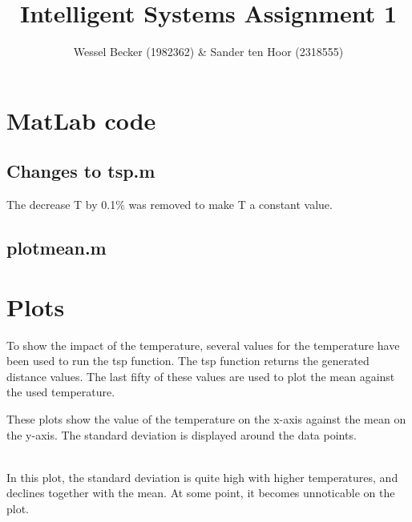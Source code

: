 \documentclass[10pt,a4paper]{article}
\begin{document}
\title{Intelligent Systems Assignment 1}
\author{Wessel Becker (1982362) \& Sander ten Hoor (2318555)}
\maketitle
\section{MatLab code}
\subsection{Changes to tsp.m}
The decrease T by 0.1\% was removed to make T a constant value.


\subsection{plotmean.m}


\section{Plots}
To show the impact of the temperature, several values for the temperature have been used to run the tsp function. The tsp function returns the generated distance values. The last fifty of these values are used to plot the mean against the used temperature.

These plots show the value of the temperature on the x-axis against the mean on the y-axis. The standard deviation is displayed around the data points.

 \\
In this plot, the standard deviation is quite high with higher temperatures, and declines together with the mean. At some point, it becomes unnoticable on the plot.\\
\end{document}
